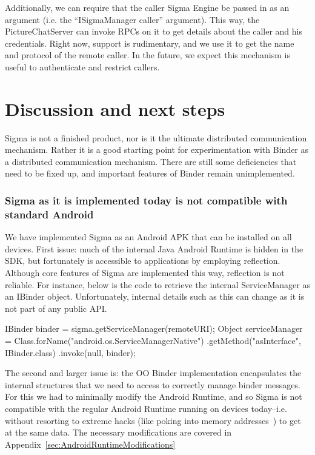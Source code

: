 \documentclass[prodmode]{acmlarge}
\begin{document}
Additionally, we can require that the caller Sigma Engine be passed in as an argument (i.e. the ``ISigmaManager caller'' argument). This way, the PictureChatServer can invoke RPCs on it to get details about the caller and his credentials. Right now, support is rudimentary, and we use it to get the name and protocol of the remote caller. In the future, we expect this mechanism is useful to authenticate and restrict callers.

\section{Discussion and next steps}
\label{sec:Discussion}
Sigma is not a finished product, nor is it the ultimate distributed communication mechanism. Rather it is a good starting point for experimentation with Binder as a distributed communication mechanism. There are still some deficiencies that need to be fixed up, and important features of Binder remain unimplemented.

\subsubsection{Sigma as it is implemented today is not compatible with standard Android}
We have implemented Sigma as an Android APK that can be installed on all devices. First issue: much of the internal Java Android Runtime is hidden in the SDK, but fortunately is accessible to applications by employing reflection. Although core features of Sigma are implemented this way, reflection is not reliable. For instance, below is the code to retrieve the internal ServiceManager as an IBinder object. Unfortunately, internal details such as this can change as it is not part of any public API.

\begin{snippet}
IBinder binder = sigma.getServiceManager(remoteURI);
Object serviceManager = Class.forName("android.os.ServiceManagerNative")
                    .getMethod("asInterface", IBinder.class)
                    .invoke(null, binder);
\end{snippet}

The second and larger issue is: the OO Binder implementation encapsulates the internal structures that we need to access to correctly manage binder messages. For this we had to minimally modify the Android Runtime, and so Sigma is not compatible with the regular Android Runtime running on devices today--i.e. without resorting to extreme hacks (like poking into memory addresses~\cite{FacebookDalvikHacks}) to get at the same data. The necessary modifications are covered in Appendix~\ref{sec:AndroidRuntimeModifications}
\end{document}
